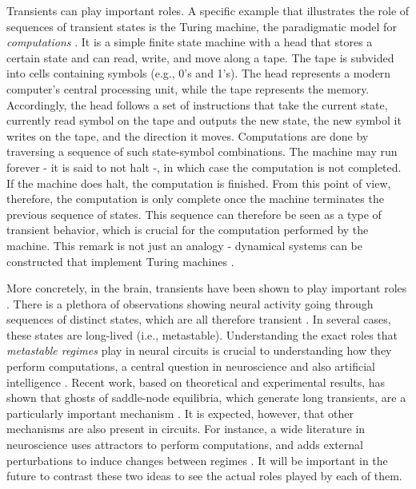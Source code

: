 Transients can play important roles. A specific example that illustrates the role of sequences of transient states is the Turing machine, the paradigmatic model for \textit{computations} \cite{turing1936on, computabilitybook}. It is a simple finite state machine with a head that stores a certain state and can read, write, and move along a tape. The tape is subvided into cells containing symbols (e.g., 0's and 1's). The head represents a modern computer's central processing unit, while the tape represents the memory. Accordingly, the head follows a set of instructions that take the current state, currently read symbol on the tape and outputs the new state, the new symbol it writes on the tape, and the direction it moves. Computations are done by traversing a sequence of such state-symbol combinations. The machine may run forever - it is said to not halt -, in which case the computation is not completed. If the machine does halt, the computation is finished. From this point of view, therefore, the computation is only complete once the machine terminates the previous sequence of states. This sequence can therefore be seen as a type of transient behavior, which is crucial for the computation performed by the machine. This remark is not just an analogy - dynamical systems can be constructed that implement Turing machines \cite{postlethwaite2024a}.

More concretely, in the brain, transients have been shown to play important roles \cite{ashwin2005when, mazor2005transient}. There is a plethora of observations showing neural activity going through sequences of distinct states, which are all therefore transient \cite{tognoli2014metastable, brinkman2022metastable}. In several cases, these states are long-lived (i.e., metastable). Understanding the exact roles that \textit{metastable regimes} play in neural circuits is crucial to understanding how they perform computations, a central question in neuroscience and also artificial intelligence \cite{koch2024biological, vyas2020computation, sussillo2013opening}. Recent work, based on theoretical and experimental results, has shown that ghosts of saddle-node equilibria, which generate long transients, are a particularly important mechanism \cite{koch2024biological, koch2024ghost, nandan2022cells, mazor2005transient}. It is expected, however, that other mechanisms are also present in circuits. For instance, a wide literature in neuroscience uses attractors to perform computations, and adds external perturbations to induce changes between regimes \cite{driscoll2024flexible, sussillo2013opening, brinkman2022metastable, laje2013robust}. It will be important in the future to contrast these two ideas to see the actual roles played by each of them.

